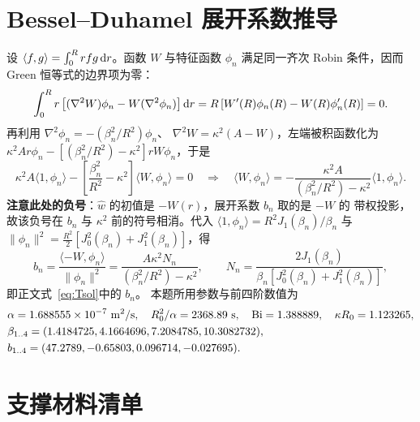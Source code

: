 \documentclass[withoutpreface,bwprint]{cumcmthesis}
\begin{document}
\newpage
\appendix

\section{Bessel--Duhamel 展开系数推导}
\label{app:besselcoef}

设 $\langle f,g\rangle=\int_0^Rrfg\,{\rm d}r$。函数 $W$ 与特征函数
$\phi_n$ 满足同一齐次 Robin 条件，因而 Green 恒等式的边界项为零：
\[
\int_0^Rr\left[(\nabla^2W)\phi_n-W(\nabla^2\phi_n)\right]{\rm d}r
=R\left[W'(R)\phi_n(R)-W(R)\phi_n'(R)\right]=0.
\]
再利用
$\nabla^2\phi_n=-(\beta_n^2/R^2)\phi_n$、
$\nabla^2W=\kappa^2(A-W)$，左端被积函数化为
$\kappa^2Ar\phi_n-\left[(\beta_n^2/R^2)-\kappa^2\right]rW\phi_n$，于是
\[
\kappa^2A\langle1,\phi_n\rangle
-\left[\frac{\beta_n^2}{R^2}-\kappa^2\right]\langle W,\phi_n\rangle=0
\quad\Longrightarrow\quad
\langle W,\phi_n\rangle
=-\frac{\kappa^2A}{(\beta_n^2/R^2)-\kappa^2}\langle1,\phi_n\rangle .
\]
\textbf{注意此处的负号}：$\hat w$ 的初值是 $-W(r)$，展开系数 $b_n$ 取的是 $-W$ 的
带权投影，故该负号在 $b_n$ 与 $\kappa^2$ 前的符号相消。代入
$\langle1,\phi_n\rangle=R^2J_1(\beta_n)/\beta_n$ 与
$\|\phi_n\|^2=\frac{R^2}{2}\left[J_0^2(\beta_n)+J_1^2(\beta_n)\right]$，得
\begin{equation}
b_n=\frac{\langle -W,\phi_n\rangle}{\|\phi_n\|^2}
=\frac{A\kappa^2N_n}{(\beta_n^2/R^2)-\kappa^2},
\qquad
N_n=\frac{2J_1(\beta_n)}{\beta_n\left[J_0^2(\beta_n)+J_1^2(\beta_n)\right]},
\label{eq:bn}
\end{equation}
即正文式~\eqref{eq:Tsol}中的 $b_n$。
本题所用参数与前四阶数值为
\[
\begin{aligned}
&\alpha=1.688555\times10^{-7}\ {\rm m^2/s},\quad R_0^2/\alpha=2368.89\ {\rm s},\quad
\mathrm{Bi}=1.388889,\quad \kappa R_0=1.123265,\\
&\beta_{1..4}=(1.4184725,4.1664696,7.2084785,10.3082732),\\
&b_{1..4}=(47.2789,-0.65803,0.096714,-0.027695).
\end{aligned}
\]

\section{支撑材料清单}
\end{document}
